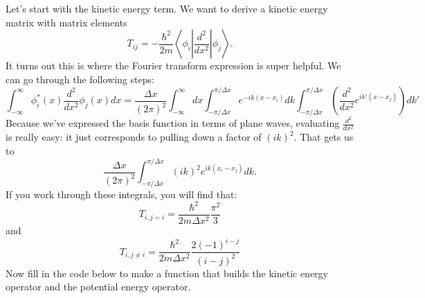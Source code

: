 \documentclass[letterpaper,10pt,english]{jupyterBook}
\begin{document}
\sphinxAtStartPar
Let’s start with the kinetic energy term. We want to derive a kinetic energy matrix with matrix elements
\label{equation:Section4_v2:3a4eeba7-b034-4004-b48d-d011de2f4d9e}\begin{equation}
T_{ij} = -\frac{\hbar^2}{2m} \left \langle \phi_i \left\lvert \frac{d^2}{dx^2} \right\rvert \phi_j \right \rangle.
\end{equation}
\sphinxAtStartPar
It turns out this is where the Fourier transform expression is super helpful. We can go through the following steps:
\label{equation:Section4_v2:28141e62-2974-47b8-89a5-730efded2525}\begin{equation}
\int_{-\infty}^{\infty} \phi_i^\ast(x) \frac{d^2}{dx^2} \phi_j(x) dx = \frac{\Delta x}{(2\pi)^2} \int_{-\infty}^{\infty} dx \int_{-\pi/\Delta x}^{\pi/\Delta x} e^{-i k (x-x_i)} dk \int_{-\pi/\Delta x}^{\pi/\Delta x} \left( \frac{d^2}{dx^2} e^{i k' (x-x_j)} \right) dk'
\end{equation}
\sphinxAtStartPar
Because we’ve expressed the basis function in terms of plane waves, evaluating \(\frac{d^2}{dx^2}\) is really easy: it just corresponds to pulling down a factor of \((ik)^2\). That gets us to
\label{equation:Section4_v2:73681b08-08e2-4111-872f-1fa7d73e5675}\begin{equation}
\frac{\Delta x}{(2\pi)^2} \int_{-\pi/\Delta x}^{\pi/\Delta x} (ik)^2 e^{i k (x_i - x_j)} dk.
\end{equation}
\sphinxAtStartPar
If you work through these integrals, you will find that:
\label{equation:Section4_v2:bea09371-086d-4cfd-ab2d-5f918123d19a}\begin{equation}
\boxed{T_{i,j=i} = \frac{\hbar^2}{2m \Delta x^2} \frac{\pi^2}{3}}
\end{equation}
\sphinxAtStartPar
and
\label{equation:Section4_v2:08c4c729-ab4c-40ae-ac95-969aab9e97ab}\begin{equation}
\boxed{T_{i,j \neq i} = \frac{\hbar^2}{2m \Delta x^2} \frac{2 (-1)^{i-j}}{(i-j)^2}}
\end{equation}
\sphinxAtStartPar
{} Now fill in the code below to make a function that builds the kinetic energy operator and the potential energy operator.
\end{document}
